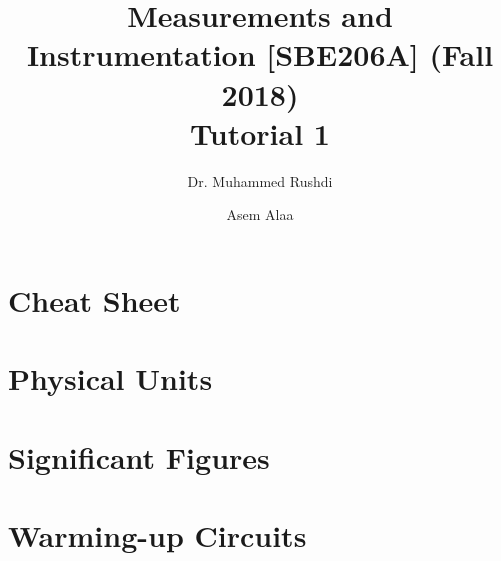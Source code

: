 \documentclass[a4paper,11pt,dvipsnames]{book}
\begin{document}
\author{Dr. Muhammed Rushdi \and Asem Alaa}

\title{Measurements and Instrumentation [SBE206A] (Fall 2018)\\ Tutorial 1}

\maketitle

\chapter*{Cheat Sheet}


\chapter*{Physical Units}



\chapter*{Significant Figures}


\chapter*{Warming-up Circuits}
\end{document}
